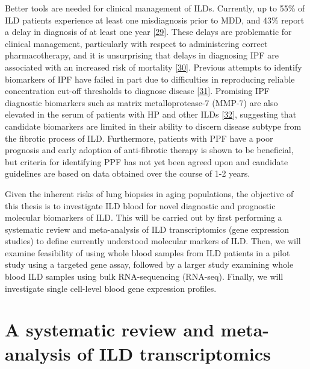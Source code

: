\documentclass[
]{article}
\begin{document}
Better tools are needed for clinical management of ILDs. Currently, up to 55\% of ILD patients experience at least one misdiagnosis prior to MDD, and 43\% report a delay in diagnosis of at least one year {[}\protect\hyperlink{ref-grewal_role_2019}{29}{]}. These delays are problematic for clinical management, particularly with respect to administering correct pharmacotherapy, and it is unsurprising that delays in diagnosing IPF are associated with an increased risk of mortality {[}\protect\hyperlink{ref-lamas_delayed_2011}{30}{]}. Previous attempts to identify biomarkers of IPF have failed in part due to difficulties in reproducing reliable concentration cut-off thresholds to diagnose disease {[}\protect\hyperlink{ref-drakopanagiotakis_biomarkers_2018}{31}{]}. Promising IPF diagnostic biomarkers such as matrix metalloprotease-7 (MMP-7) are also elevated in the serum of patients with HP and other ILDs {[}\protect\hyperlink{ref-morais_serum_2015}{32}{]}, suggesting that candidate biomarkers are limited in their ability to discern disease subtype from the fibrotic process of ILD. Furthermore, patients with PPF have a poor prognosis and early adoption of anti-fibrotic therapy is shown to be beneficial, but criteria for identifying PPF has not yet been agreed upon and candidate guidelines are based on data obtained over the course of 1-2 years.

Given the inherent risks of lung biopsies in aging populations, the objective of this thesis is to investigate ILD blood for novel diagnostic and prognostic molecular biomarkers of ILD. This will be carried out by first performing a systematic review and meta-analysis of ILD transcriptomics (gene expression studies) to define currently understood molecular markers of ILD. Then, we will examine feasibility of using whole blood samples from ILD patients in a pilot study using a targeted gene assay, followed by a larger study examining whole blood ILD samples using bulk RNA-sequencing (RNA-seq). Finally, we will investigate single cell-level blood gene expression profiles.

\clearpage

\hypertarget{a-systematic-review-and-meta-analysis-of-ild-transcriptomics}{%
\section{A systematic review and meta-analysis of ILD transcriptomics}\label{a-systematic-review-and-meta-analysis-of-ild-transcriptomics}}

\renewcommand{\thefigure}{2.\arabic{figure}}
\setcounter{figure}{0}
\renewcommand{\thetable}{2.\arabic{table}}
\setcounter{table}{0}
\renewcommand{\theequation}{2.\arabic{equation}}
\setcounter{equation}{0}
\end{document}
